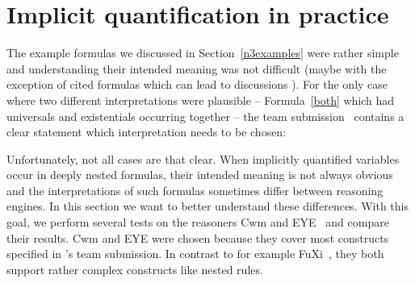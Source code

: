 \section{Implicit quantification in practice}
The example formulas we discussed in Section~\ref{n3examples} were rather simple and understanding their intended meaning was not 
 difficult (maybe with the exception of cited formulas which can lead to discussions \cite{TriGsemantics}). For the only case where 
two different interpretations were plausible -- Formula~\ref{both} which had universals and existentials occurring together --
the \wwwc team submission~\cite{Notation3} contains a clear statement which interpretation needs to be chosen: \\


Unfortunately, not all cases are that clear.
% 
% 
%
When implicitly quantified variables occur in deeply nested formulas, 
 their intended meaning is not always obvious and the interpretations of such formulas sometimes differ between reasoning engines. 
%
In this section we want to better understand these differences. 
With this goal, we perform several tests on the reasoners Cwm \cite{cwm} and EYE~\cite{eyepaper} and compare their results. 
Cwm and EYE were chosen because they cover most constructs specified in \nthree{}'s \wwwc team submission. 
In contrast to for example FuXi~\cite{fuxi}, they both support rather complex constructs like nested rules. 



